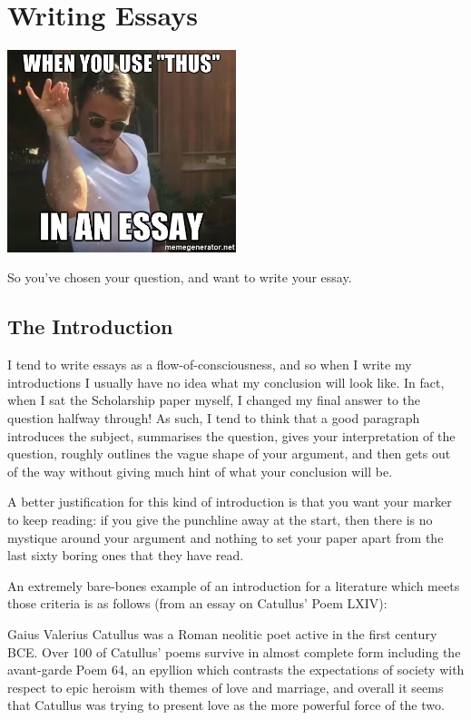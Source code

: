 \documentclass[a4paper,10pt]{article}
\begin{document}
\section{Writing Essays}
\begin{center}
  \includegraphics[width=0.5\textwidth]{essay}
\end{center}
So you've chosen your question, and want to write your essay.

\subsection{The Introduction}
I tend to write essays as a flow-of-consciousness, and so when I write my introductions I usually have no idea what
my conclusion will look like. In fact, when I sat the Scholarship paper myself, I changed my final answer to the question
halfway through! As such, I tend to think that a good paragraph introduces the subject, summarises the question, gives your
interpretation of the question, roughly outlines the vague shape of your argument, and then gets out of the way without
giving much hint of what your conclusion will be.

A better justification for this kind of introduction is that you want your marker to keep reading: if you give the
punchline away at the start, then there is no mystique around your argument and nothing to set your paper apart
from the last sixty boring ones that they have read.

An extremely bare-bones example of an introduction for a literature which meets those criteria is as follows (from an essay on Catullus' Poem LXIV):
\begin{mdframed}
  Gaius Valerius Catullus was a Roman neolitic poet active in the first century BCE. Over 100 of Catullus' poems
  survive in almost complete form including the avant-garde Poem 64, an epyllion which contrasts the expectations
  of society with respect to epic heroism with themes of love and marriage, and overall it seems that Catullus was
  trying to present love as the more powerful force of the two.
\end{mdframed}
\end{document}

